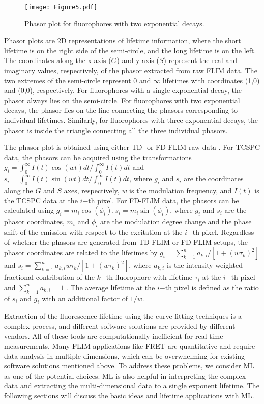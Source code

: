 \documentclass[12pt]{iopart}
\begin{document}
\begin{figure}[!t]
\centering
\texttt{[image: Figure5.pdf]}
\caption{Phasor plot for fluorophores with two exponential decays.}
\label{td_fd_expla}
\end{figure}

Phasor plots are 2D representations of lifetime information, where the short lifetime is on the right side of the semi-circle, and the long lifetime is on the left. The coordinates along the x-axis ($G$) and y-axis ($S$) represent the real and imaginary values, respectively, of the phasor extracted from raw FLIM data. The two extremes of the semi-circle represent 0 and $\infty$ lifetimes with coordinates (1,0) and (0,0), respectively. For fluorophores with a single exponential decay, the phasor always lies on the semi-circle. For fluorophores with two exponential decays, the phasor lies on the line connecting the phasors corresponding to individual lifetimes. Similarly, for fluorophores with three exponential decays, the phasor is inside the triangle connecting all the three individual phasors.

The phasor plot is obtained using either TD- or FD-FLIM raw data \cite{flim_phasors}. For TCSPC data, the phasors can be acquired using the transformations $g_i = \int_0^\infty I(t)\cos(wt)dt/\int_0^\infty I(t)dt$ and $s_i = \int_0^\infty I(t)\sin(wt)dt/\int_0^\infty I(t)dt$, where $g_i$ and $s_i$ are the coordinates along the $G$ and $S$ axes, respectively, $w$ is the modulation frequency, and $I(t)$ is the TCSPC data at the $i\mathrm{-th}$ pixel. For FD-FLIM data, the phasors can be calculated using $g_i = m_i\cos(\phi_i), s_i =  m_i\sin(\phi_i)$, where $g_i$ and $s_i$ are the phasor coordinates, $m_i$ and $\phi_i$ are the modulation degree change and the phase shift of the emission with respect to the excitation at the $i\mathrm{-th}$ pixel. Regardless of whether the phasors are generated from TD-FLIM or FD-FLIM setups, the phasor coordinates are related to the lifetimes by $g_i = \sum_{k=1}^{n}a_{k,i}/[1+(w\tau_k)^2]$ and $s_i = \sum_{k=1}^{n}a_{k,i}w\tau_k/[1+(w\tau_k)^2]$, where $a_{k,i}$ is the intensity-weighted fractional contribution of the $k\mathrm{-th}$ fluorophore with lifetime $\tau_i$ at the $i\mathrm{-th}$ pixel and $\sum_{k=1}^{n}a_{k,i} = 1$ \cite{phasors}. The average lifetime at the $i\mathrm{-th}$ pixel is defined as the ratio of $s_i$ and $g_i$ with an additional factor of $1/w$.

Extraction of the fluorescence lifetime using the curve-fitting techniques is a complex process, and different software solutions are provided by different vendors\cite{spcimage, symphotime64, EasyTau2, flimfast, vistavision, flimfit, clip, li-flim, decayfit, cellSens}. All of these tools are computationally inefficient for real-time measurements. Many FLIM applications like FRET are quantitative and require data analysis in multiple dimensions, which can be overwhelming for existing software solutions mentioned above. To address these problems, we consider ML as one of the potential choices. ML is also helpful in interpreting the complex data and extracting the multi-dimensional data to a single exponent lifetime. The following sections will discuss the basic ideas and lifetime applications with ML.
\end{document}
